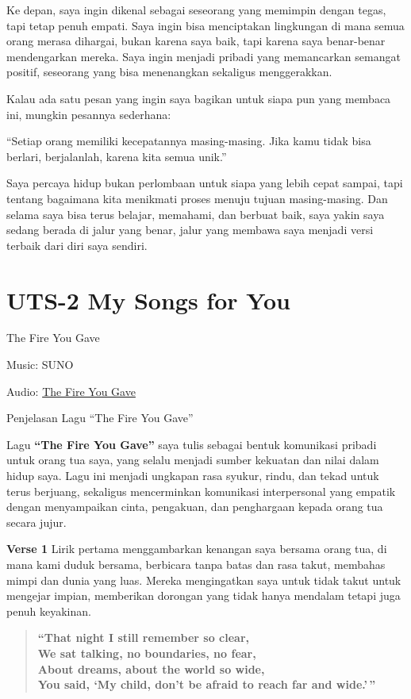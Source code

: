 \documentclass[
  letterpaper,
  DIV=11,
  numbers=noendperiod]{scrreprt}
\begin{document}
Ke depan, saya ingin dikenal sebagai seseorang yang memimpin dengan
tegas, tapi tetap penuh empati. Saya ingin bisa menciptakan lingkungan
di mana semua orang merasa dihargai, bukan karena saya baik, tapi karena
saya benar-benar mendengarkan mereka. Saya ingin menjadi pribadi yang
memancarkan semangat positif, seseorang yang bisa menenangkan sekaligus
menggerakkan.

Kalau ada satu pesan yang ingin saya bagikan untuk siapa pun yang
membaca ini, mungkin pesannya sederhana:

``Setiap orang memiliki kecepatannya masing-masing. Jika kamu tidak bisa
berlari, berjalanlah, karena kita semua unik.''

Saya percaya hidup bukan perlombaan untuk siapa yang lebih cepat sampai,
tapi tentang bagaimana kita menikmati proses menuju tujuan
masing-masing. Dan selama saya bisa terus belajar, memahami, dan berbuat
baik, saya yakin saya sedang berada di jalur yang benar, jalur yang
membawa saya menjadi versi terbaik dari diri saya sendiri.


\chapter{UTS-2 My Songs for You}\label{uts-2-my-songs-for-you}

The Fire You Gave

Music: SUNO

Audio: \href{./The\%20Fire\%20You\%20Gave.mp3}{The Fire You Gave}

Penjelasan Lagu ``The Fire You Gave''

Lagu \textbf{``The Fire You Gave''} saya tulis sebagai bentuk komunikasi
pribadi untuk orang tua saya, yang selalu menjadi sumber kekuatan dan
nilai dalam hidup saya. Lagu ini menjadi ungkapan rasa syukur, rindu,
dan tekad untuk terus berjuang, sekaligus mencerminkan komunikasi
interpersonal yang empatik dengan menyampaikan cinta, pengakuan, dan
penghargaan kepada orang tua secara jujur.

\textbf{Verse 1} Lirik pertama menggambarkan kenangan saya bersama orang
tua, di mana kami duduk bersama, berbicara tanpa batas dan rasa takut,
membahas mimpi dan dunia yang luas. Mereka mengingatkan saya untuk tidak
takut untuk mengejar impian, memberikan dorongan yang tidak hanya
mendalam tetapi juga penuh keyakinan.

\begin{quote}
\textbf{``That night I still remember so clear,\\
We sat talking, no boundaries, no fear,\\
About dreams, about the world so wide,\\
You said, `My child, don't be afraid to reach far and wide.'\,''}
\end{quote}
\end{document}
